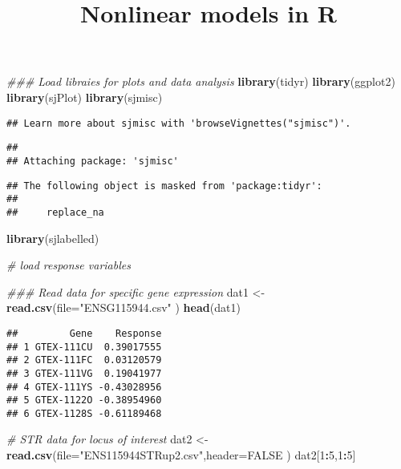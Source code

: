\documentclass[
]{article}
\title{Nonlinear models in R}
\author{}
\date{\vspace{-2.5em}}
\newenvironment{Shaded}{\begin{snugshade}}{\end{snugshade}}
\newcommand{\CommentTok}[1]{\textcolor[rgb]{0.56,0.35,0.01}{\textit{#1}}}
\newcommand{\DataTypeTok}[1]{\textcolor[rgb]{0.13,0.29,0.53}{#1}}
\newcommand{\DecValTok}[1]{\textcolor[rgb]{0.00,0.00,0.81}{#1}}
\newcommand{\KeywordTok}[1]{\textcolor[rgb]{0.13,0.29,0.53}{\textbf{#1}}}
\newcommand{\NormalTok}[1]{#1}
\newcommand{\OperatorTok}[1]{\textcolor[rgb]{0.81,0.36,0.00}{\textbf{#1}}}
\newcommand{\OtherTok}[1]{\textcolor[rgb]{0.56,0.35,0.01}{#1}}
\newcommand{\StringTok}[1]{\textcolor[rgb]{0.31,0.60,0.02}{#1}}
\begin{document}
\maketitle

\begin{Shaded}
\begin{Highlighting}[]
\CommentTok{### Load libraies for plots and data analysis}
\KeywordTok{library}\NormalTok{(tidyr)}
\KeywordTok{library}\NormalTok{(ggplot2)}
\KeywordTok{library}\NormalTok{(sjPlot)}
\KeywordTok{library}\NormalTok{(sjmisc)}
\end{Highlighting}
\end{Shaded}

\begin{verbatim}
## Learn more about sjmisc with 'browseVignettes("sjmisc")'.
\end{verbatim}

\begin{verbatim}
## 
## Attaching package: 'sjmisc'
\end{verbatim}

\begin{verbatim}
## The following object is masked from 'package:tidyr':
## 
##     replace_na
\end{verbatim}

\begin{Shaded}
\begin{Highlighting}[]
\KeywordTok{library}\NormalTok{(sjlabelled)}

\CommentTok{# load response variables}

\CommentTok{### Read data for specific gene expression}
\NormalTok{dat1 <-}\StringTok{ }\KeywordTok{read.csv}\NormalTok{(}\DataTypeTok{file=}\StringTok{"ENSG115944.csv"}\NormalTok{ )}
\KeywordTok{head}\NormalTok{(dat1)}
\end{Highlighting}
\end{Shaded}

\begin{verbatim}
##         Gene    Response
## 1 GTEX-111CU  0.39017555
## 2 GTEX-111FC  0.03120579
## 3 GTEX-111VG  0.19041977
## 4 GTEX-111YS -0.43028956
## 5 GTEX-1122O -0.38954960
## 6 GTEX-1128S -0.61189468
\end{verbatim}

\begin{Shaded}
\begin{Highlighting}[]
\CommentTok{# STR data for locus of interest}
\NormalTok{dat2 <-}\StringTok{ }\KeywordTok{read.csv}\NormalTok{(}\DataTypeTok{file=}\StringTok{"ENS115944STRup2.csv"}\NormalTok{,}\DataTypeTok{header=}\OtherTok{FALSE}\NormalTok{ )}
\NormalTok{dat2[}\DecValTok{1}\OperatorTok{:}\DecValTok{5}\NormalTok{,}\DecValTok{1}\OperatorTok{:}\DecValTok{5}\NormalTok{]}
\end{Highlighting}
\end{Shaded}
\end{document}
